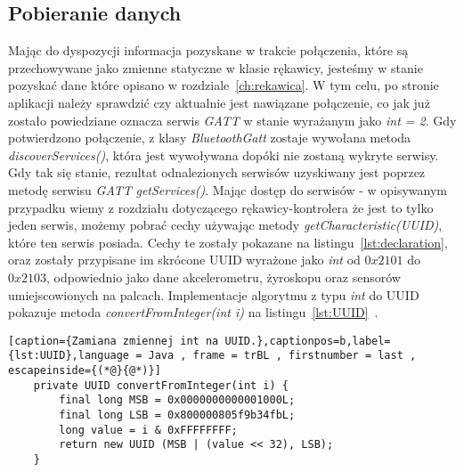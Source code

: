 	\subsection{Pobieranie danych}
	\label{subsec:dane}
	Mając do dyspozycji informacja pozyskane w trakcie połączenia, które są przechowywane jako zmienne statyczne w klasie rękawicy, jesteśmy w stanie pozyskać dane które opisano w rozdziale~\ref{ch:rekawica}. W tym celu, po stronie aplikacji należy sprawdzić czy aktualnie jest nawiązane połączenie, co jak już zostało powiedziane oznacza serwis \textit{GATT} w stanie wyrażanym jako \textit{int = 2}.  Gdy potwierdzono połączenie, z klasy \textit{BluetoothGatt} zostaje wywołana metoda \textit{discoverServices()}, która jest wywoływana dopóki nie zostaną wykryte serwisy. Gdy tak się stanie, rezultat odnalezionych serwisów uzyskiwany jest poprzez metodę serwisu \textit{GATT} \textit{getServices()}. Mając dostęp do serwisów - w opisywanym przypadku wiemy z rozdziału dotyczącego rękawicy-kontrolera że jest to tylko jeden serwis, możemy pobrać cechy używając metody \textit{getCharacteristic(UUID)}, które ten serwis posiada. Cechy te zostały pokazane na listingu~\ref{lst:declaration}, oraz zostały przypisane im skrócone UUID wyrażone jako \textit{int} od $0x2101$ do $0x2103$, odpowiednio jako dane akcelerometru, żyroskopu oraz sensorów umiejscowionych na palcach. Implementacje algorytmu z typu \textit{int} do UUID pokazuje metoda \textit{convertFromInteger(int i)} na listingu~\ref{lst:UUID}~\cite{UUID}. 
	\begin{lstlisting}[caption={Zamiana zmiennej int na UUID.},captionpos=b,label={lst:UUID},language = Java , frame = trBL , firstnumber = last , escapeinside={(*@}{@*)}]
	private UUID convertFromInteger(int i) {
        final long MSB = 0x0000000000001000L;
        final long LSB = 0x800000805f9b34fbL;
        long value = i & 0xFFFFFFFF;
        return new UUID (MSB | (value << 32), LSB);
    }                                                       
\end{lstlisting}

